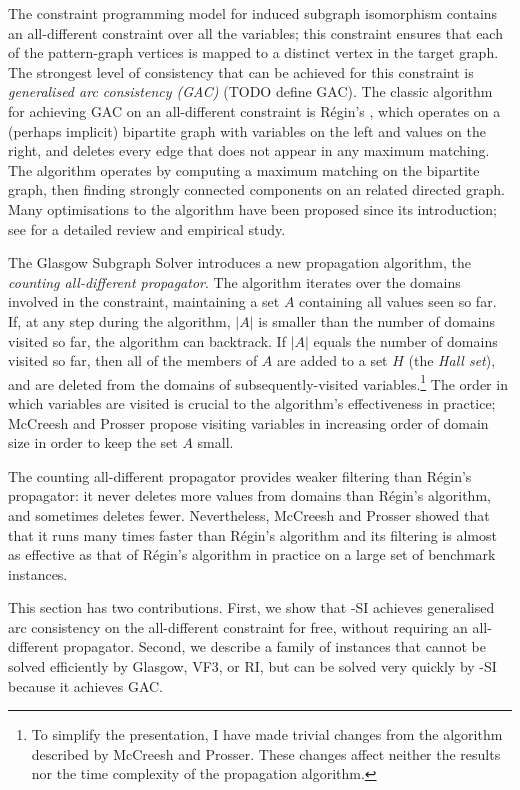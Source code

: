 The constraint programming model for induced subgraph isomorphism contains an all-different
constraint over all the variables; this constraint ensures that each of the pattern-graph vertices
is mapped to a distinct vertex in the target graph.  The strongest level of consistency that can
be achieved for this constraint is \emph{generalised arc consistency (GAC)} (TODO define GAC).
The classic algorithm for achieving GAC on an all-different constraint is R\'egin's
\cite{DBLP:conf/aaai/Regin94}, which operates
on a (perhaps implicit) bipartite graph with variables on the left and values on the right, and 
deletes every edge that does not appear in any maximum matching.  The algorithm operates by computing
a maximum matching on the bipartite graph, then finding strongly connected components on an related directed
graph.  Many optimisations to the algorithm have been proposed since its introduction; see
\cite{DBLP:journals/ai/GentMN08} for a detailed review and empirical study.

The Glasgow Subgraph Solver \cite{DBLP:conf/cp/McCreeshP15} introduces a new propagation algorithm,
the \emph{counting all-different propagator}.
The algorithm iterates over the domains involved in the constraint, maintaining a set $A$ containing
all values seen so far.  If, at any step during the algorithm, $|A|$ is smaller than the number
of domains visited so far, the algorithm can backtrack.  If $|A|$ equals the number of domains visited
so far, then all of the members of $A$ are added to a set $H$ (the \emph{Hall set}), and are deleted from
the domains of subsequently-visited variables.\footnote{To simplify the presentation,
I have made trivial changes from the algorithm described by McCreesh and Prosser.
These changes affect neither the results nor the time complexity of the propagation algorithm.}
The order in which variables are visited is crucial
to the algorithm's effectiveness in practice; McCreesh and Prosser
propose visiting variables in increasing order of domain size in order to keep the set $A$ small.

The counting all-different propagator provides weaker filtering than
R\'egin's propagator: it never deletes more values from domains than R\'egin's algorithm, and sometimes
deletes fewer. Nevertheless, McCreesh and Prosser showed that that it runs many times faster than
R\'egin's algorithm and its filtering is almost as effective as that of R\'egin's algorithm in practice
on a large set of benchmark instances.

This section has two contributions. First, we show that \McSplit-SI achieves generalised arc consistency
on the all-different constraint for free, without requiring an all-different propagator.  Second, we describe
a family of instances that cannot be solved efficiently by Glasgow, VF3, or RI, but can be solved very
quickly by \McSplit-SI because it achieves GAC.

